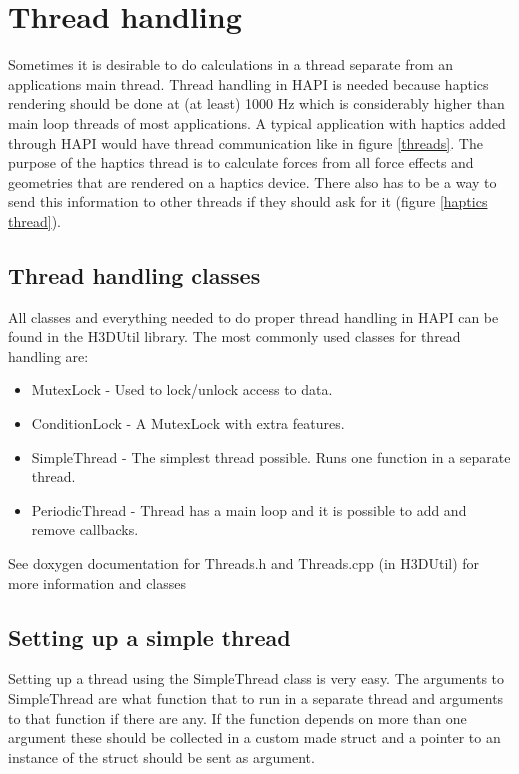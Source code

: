 \chapter{Thread handling}

Sometimes it is desirable to do calculations in a thread separate from an
applications main thread. Thread handling in HAPI is needed because haptics
rendering should be done at (at least) 1000 Hz which is considerably higher
than main loop threads of most applications. A typical application with haptics
added through HAPI would have thread communication like in figure \ref{threads}.
The purpose of the haptics thread is to calculate forces from all force effects
and geometries that are rendered on a haptics device. There also has to be a way
to send this information to other threads if they should ask for it (figure
\ref{haptics thread}).

\section{Thread handling classes}
All classes and everything needed to do proper thread handling in HAPI can be
found in the H3DUtil library. The most commonly used
classes for thread handling are:

\begin{itemize}
\item MutexLock - Used to lock/unlock access to data.
\item ConditionLock - A MutexLock with extra features.
\item SimpleThread - The simplest thread possible. Runs one function in a
separate thread.
\item PeriodicThread - Thread has a main loop and it is possible to add and
remove callbacks.
\end{itemize}

See doxygen documentation for Threads.h and Threads.cpp (in H3DUtil) for more
information and classes

\section{Setting up a simple thread}
\label{secSimpleThread}
Setting up a thread using the SimpleThread class is very easy.
The arguments to SimpleThread are what function that to run in a
separate thread and arguments to that function if there are any. If the
function depends on more than one argument these should be collected in a
custom made struct and a pointer to an instance of the struct should be sent
as argument.

